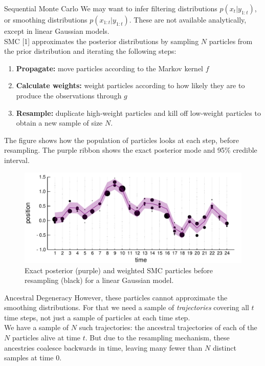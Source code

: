 \documentclass[final, 12pt]{beamer}
\newlength{\colwidth}
\begin{document}
\begin{frame}
\begin{columns}
\begin{column}{\colwidth}
\begin{block}{Sequential Monte Carlo}
We may want to infer filtering distributions $p(x_t | y_{1:t})$, or smoothing distributions $p(x_{1:t} | y_{1:t})$. 
These are not available analytically, except in linear Gaussian models. \\[12pt]

SMC [1] approximates the posterior distributions by sampling $N$ particles from the prior distribution and iterating the following steps:
\begin{enumerate}
\item \textbf{Propagate:} move particles according to the Markov kernel $f$
\item \textbf{Calculate weights:} weight particles according to how likely they are to produce the observations through $g$
\item \textbf{Resample:} duplicate high-weight particles and kill off low-weight particles to obtain a new sample of size $N$.
\end{enumerate}

\vspace*{10pt}

The figure shows how the population of particles looks at each step, before resampling. The purple ribbon shows the exact posterior mode and 95\% credible interval.
\begin{figure}
\includegraphics[width=\colwidth]{smc_kalman_3.pdf}
\caption{Exact posterior (purple) and weighted SMC particles before resampling (black) for a linear Gaussian model.}
\end{figure}
\end{block}

\begin{block}{Ancestral Degeneracy}
However, these particles cannot approximate the smoothing distributions. For that we need a sample of \emph{trajectories} covering all $t$ time steps, not just a sample of particles at each time step.\\[10pt]

We have a sample of $N$ such trajectories: the ancestral trajectories of each of the $N$ particles alive at time $t$.
But due to the resampling mechanism, these ancestries coalesce backwards in time, leaving many fewer than $N$ distinct samples at time 0. 


\end{block}
\end{column}
\end{columns}
\end{frame}
\end{document}
